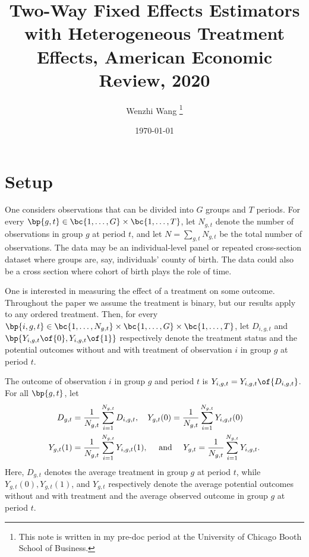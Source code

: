 \documentclass[12pt]{article}
\theoremstyle{definition}
\begin{document}

\title{\bf Two-Way Fixed Effects Estimators with Heterogeneous Treatment Effects, American Economic Review, 2020}
\author{Wenzhi Wang \thanks{This note is written in my pre-doc period at the University of Chicago Booth School of Business.} } 
\date{\today}
\maketitle

\citet{dechaisemartinTwoWayFixedEffects2020}

\section{Setup} \label{sec_setup}

One considers observations that can be divided into $G$ groups and $T$ periods. For every $\bp{g, t} \in \bc{1, \ldots, G} \times \bc{1, \ldots, T}$, let $N_{g,t}$ denote the number of observations in group $g$ at period $t$, and let $N = \sum_{g,t} N_{g,t}$ be the total number of observations. The data may be an individual-level panel or repeated cross-section dataset where groups are, say, individuals' county of birth. The data could also be a cross section where cohort of birth plays the role of time. 

One is interested in measuring the effect of a treatment on some outcome. Throughout the paper we assume the treatment is binary, but our results apply to any ordered treatment. Then, for every $\bp{i,g,t} \in \bc{1, \ldots, N_{g,t}} \times \bc{1, \ldots, G} \times \bc{1, \ldots, T}$, let $D_{i,g,t}$ and $\bp{Y_{i,g,t}\of{0}, Y_{i,g,t}\of{1}}$ respectively denote the treatment status and the potential outcomes without and with treatment of observation $i$ in group $g$ at period $t$.

The outcome of observation $i$ in group $g$ and period $t$ is $Y_{i,g,t} = Y_{i,g,t}\of{D_{i,g,t}}$. For all $\bp{g,t}$, let 
\begin{equation}
    \notag 
    \begin{aligned}
    D_{g, t} & =\frac{1}{N_{g, t}} \sum_{i=1}^{N_{g, t}} D_{i, g, t}, \quad Y_{g, t}(0)=\frac{1}{N_{g, t}} \sum_{i=1}^{N_{g, t}} Y_{i, g, t}(0) \\
    Y_{g, t}(1) & =\frac{1}{N_{g, t}} \sum_{i=1}^{N_{g, t}} Y_{i, g, t}(1), \quad \text { and } \quad Y_{g, t}=\frac{1}{N_{g, t}} \sum_{i=1}^{N_{g, t}} Y_{i, g, t} .
    \end{aligned}
\end{equation}
Here, $D_{g,t}$ denotes the average treatment in group $g$ at period $t$, while $Y_{g, t}(0), Y_{g, t}(1)$, and $Y_{g, t}$ respectively denote the average potential outcomes without and with treatment and the average observed outcome in group $g$ at period $t$.
\end{document}
